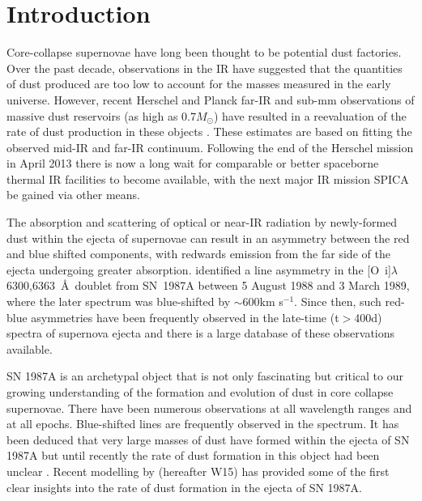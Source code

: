 \documentclass[useAMS,usenatbib,usegraphicx]{mnras}
\begin{document}
\section{Introduction}

Core-collapse supernovae have long been thought to be potential dust 
factories.  Over the past decade, observations in the IR have suggested 
that the quantities of dust produced are too low to account for the masses 
measured in the early universe.  However, recent Herschel and Planck 
far-IR and sub-mm observations of massive dust reservoirs (as high as 
0.7$M_{\odot}$) have resulted in a reevaluation of the rate of dust 
production in these objects \citep{Barlow2010, Matsuura2011, Gomez2012}.  These estimates are based on fitting the observed mid-IR 
and far-IR continuum. Following the end of the Herschel mission in April 
2013 there is now a long wait for comparable or better spaceborne thermal 
IR facilities to become available, with the next major IR mission SPICA 
be gained via other means.
   
The absorption and scattering of optical or near-IR radiation by 
newly-formed dust within the ejecta of supernovae can result in an 
asymmetry between the red and blue shifted components, with redwards 
emission from the far side of the ejecta undergoing greater absorption.  
\citet{Lucy1989} identified a line asymmetry in the [O~{\sc i}]$\lambda$6300,6363~\AA\ doublet
from SN~1987A between 5 August 1988 and 3 March 1989, where the later 
spectrum was blue-shifted by $\sim 600 $km s$^{-1}$. Since then, such 
red-blue asymmetries have been frequently observed in the late-time 
(t$>$400d) spectra of supernova ejecta and there is a large database of 
these observations 
available\citep{Fabbri2011,Lucy1989}.

SN 1987A is an archetypal object that is not only fascinating but critical to our 
growing understanding of the formation and evolution of dust in core 
collapse supernovae.  There have been numerous observations at all 
wavelength ranges and at all epochs. Blue-shifted lines are frequently 
observed in the spectrum.  It has been deduced that very large masses of 
dust have formed within the ejecta of SN 1987A 
but until recently the rate of dust formation in this object had been 
unclear \citep{Matsuura2011}.  Recent modelling by \citet{Wesson2015} (hereafter W15) has 
provided some of the first clear insights into the rate of dust formation 
in the ejecta of SN 1987A.
\end{document}
